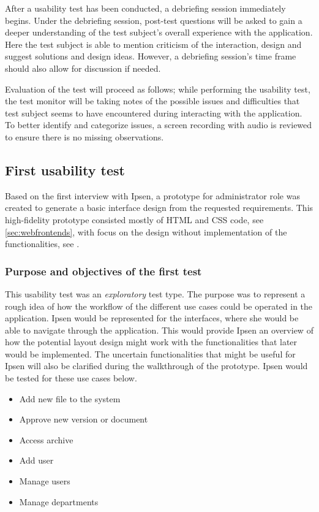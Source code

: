 After a usability test has been conducted, a debriefing session immediately begins.
Under the debriefing session, post-test questions will be asked to gain a deeper understanding of the test subject's overall experience with the application.
Here the test subject is able to mention criticism of the interaction, design and suggest solutions and design ideas.
However, a debriefing session's time frame should also allow for discussion if needed.

Evaluation of the test will proceed as follows; while performing the usability test, the test monitor will be taking notes of the possible issues and difficulties that test subject seems to have encountered during interacting with the application.
To better identify and categorize issues, a screen recording with audio is reviewed to ensure there is no missing observations.

\subsection{First usability test}\label{firsttest}
Based on the first interview with Ipsen, a prototype for administrator role was created to generate a basic interface design from the requested requirements.
This high-fidelity prototype consisted mostly of HTML and CSS code, see \cref{sec:webfrontends}, with focus on the design without implementation of the functionalities, see .

\subsubsection*{Purpose and objectives of the first test}
This usability test was an \textit{exploratory} test type.
The purpose was to represent a rough idea of how the workflow of the different use cases could be operated in the application.
Ipsen would be represented for the interfaces, where she would be able to navigate through the application.
This would provide Ipsen an overview of how the potential layout design might work with the functionalities that later would be implemented.
The uncertain functionalities that might be useful for Ipsen will also be clarified during the walkthrough of the prototype.
Ipsen would be tested for these use cases below.

\begin{itemize}
	\item Add new file to the system
	\item Approve new version or document
	\item Access archive
	\item Add user
	\item Manage users
	\item Manage departments
\end{itemize}

